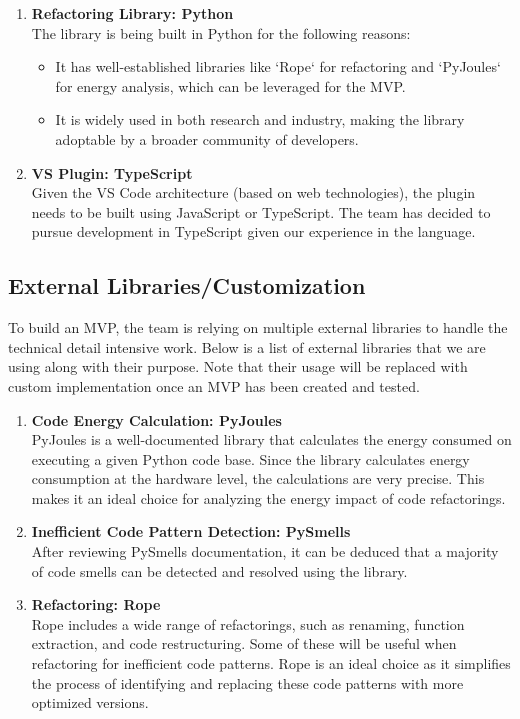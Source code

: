 \documentclass{article}
\begin{document}
\begin{enumerate}
    \item \textbf{Refactoring Library: Python}\\
    The library is being built in Python for the following reasons:
    \begin{itemize}
        \item It has well-established libraries like `Rope` for refactoring and `PyJoules` for energy analysis, which can be leveraged for the MVP.
        \item It is widely used in both research and industry, making the library adoptable by a broader community of developers.
    \end{itemize}
    \item \textbf{VS Plugin: TypeScript}\\
    Given the VS Code architecture (based on web technologies), the plugin needs to be built using JavaScript or TypeScript. The team has decided to pursue development in TypeScript given our experience in the language.
\end{enumerate}

\subsection{External Libraries/Customization}
To build an MVP, the team is relying on multiple external libraries to handle the technical detail intensive work. Below is a list of external libraries that we are using along with their purpose. Note that their usage will be replaced with custom implementation once an MVP has been created and tested.

\begin{enumerate}
    \item \textbf{Code Energy Calculation: PyJoules}\\
    PyJoules is a well-documented library that calculates the energy consumed on executing a given Python code base. Since the library calculates energy consumption at the hardware level, the calculations are very precise. This makes it an ideal choice for analyzing the energy impact of code refactorings.

    \item \textbf{Inefficient Code Pattern Detection: PySmells}\\
    After reviewing PySmells documentation, it can be deduced that a majority of code smells can be detected and resolved using the library.

    \item \textbf{Refactoring: Rope}\\
    Rope includes a wide range of refactorings, such as renaming, function extraction, and code restructuring. Some of these will be useful when refactoring for inefficient code patterns. Rope is an ideal choice as it simplifies the process of identifying and replacing these code patterns with more optimized versions.
\end{enumerate}
\end{document}
